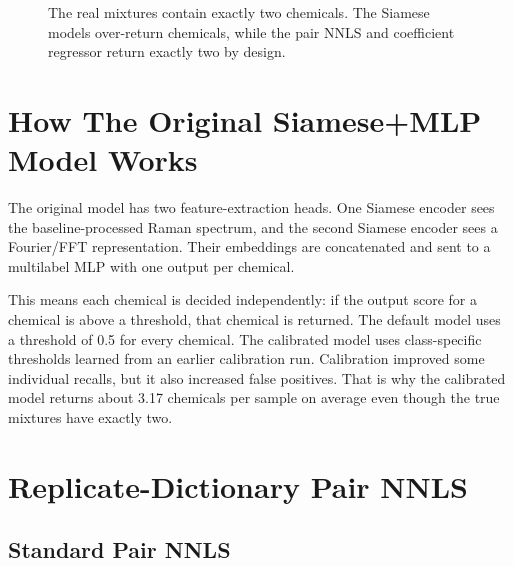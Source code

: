 \documentclass[11pt]{article}
\begin{document}
\begin{figure}[ht]
\centering
{}
\caption{The real mixtures contain exactly two chemicals. The Siamese models over-return chemicals, while the pair NNLS and coefficient regressor return exactly two by design.}
\end{figure}

\section*{How The Original Siamese+MLP Model Works}

The original model has two feature-extraction heads. One Siamese encoder sees the baseline-processed Raman spectrum, and the second Siamese encoder sees a Fourier/FFT representation. Their embeddings are concatenated and sent to a multilabel MLP with one output per chemical.

This means each chemical is decided independently: if the output score for a chemical is above a threshold, that chemical is returned. The default model uses a threshold of 0.5 for every chemical. The calibrated model uses class-specific thresholds learned from an earlier calibration run. Calibration improved some individual recalls, but it also increased false positives. That is why the calibrated model returns about 3.17 chemicals per sample on average even though the true mixtures have exactly two.

\section*{Replicate-Dictionary Pair NNLS}

\subsection*{Standard Pair NNLS}
\end{document}

